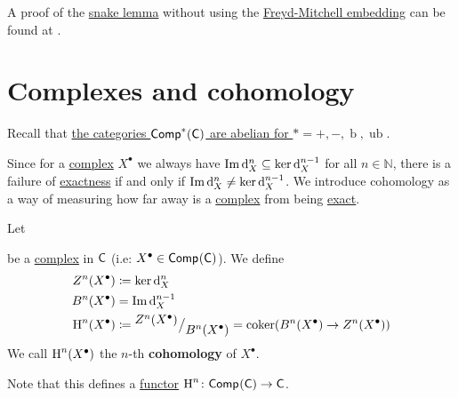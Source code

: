 \documentclass[../../main]{subfiles}
\begin{document}
\begin{remark}
  A proof of the \hyperref[lemma:snake-lemma]{snake lemma} without using the \hyperref[thm:freyd-mitchell]{Freyd-Mitchell embedding} can be found at \cite{wiseNONELEMENTARYPROOFSNAKEa}.
\end{remark}


\section{Complexes and cohomology}

Recall that \hyperref[cor:complex-category-is-abelian]{the categories \(\Complex[\ast]{\category{C}}\) are abelian for \(\ast = +, -, \operatorname{b}, \operatorname{ub}\)}.

Since for a \hyperref[def:complex]{complex} \(X^{\bullet}\) we always have \(\operatorname{Im} \d_{X}^{n} \subseteq \ker \d_{X}^{n-1}\) for all \(n \in \mathbb{N}\), there is a failure of \hyperref[def:exact-sequence]{exactness} if and only if \(\operatorname{Im} \d_{X}^{n} \neq \ker \d_{X}^{n-1}\).
We introduce cohomology as a way of measuring how far away is a \hyperref[def:complex]{complex} from being \hyperref[def:exact-sequence]{exact}.

\begin{definition}[Cohomology]\label{def:cohomology}
  Let
  \begin{center}
  \end{center}
  be a \hyperref[def:complex]{complex} in \(\category{C}\) (i.e: \(X^{\bullet} \in \Complex{\category{C}}\)).
  We define
  \begin{align*}
    Z^{n}(X^{\bullet}) &\coloneq \ker \d_{X}^{n}  \\
    B^{n}(X^{\bullet}) &= \operatorname{Im} \d_{X}^{n-1} \\
    \cohomology{n}(X^{\bullet}) &\coloneq \quot{Z^{n}(X^{\bullet})}{B^{n}(X^{\bullet})} = \coker(B^{n}(X^{\bullet}) \to Z^{n}(X^{\bullet}))
  \end{align*}
  We call \(\cohomology{n}(X^{\bullet})\) the \(n\)-th \textbf{cohomology} of \(X^{\bullet}\).

  Note that this defines a \hyperref[def:functor]{functor} \(\cohomology{n}\colon \Complex{\category{C}} \to \category{C}\).
\end{definition}
\end{document}

